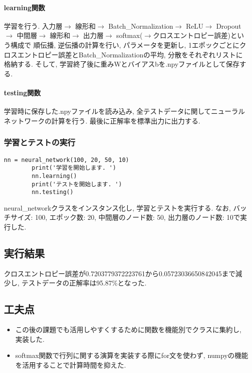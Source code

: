 \documentclass[a4j, titlepage]{jarticle}
\begin{document}
\begin{itemize}
        \paragraph*{learning関数}
            学習を行う.
            入力層$\rightarrow$
            線形和$\rightarrow$
            Batch\_Normalization$\rightarrow$
            ReLU$\rightarrow$
            Dropout$\rightarrow$
            中間層$\rightarrow$
            線形和$\rightarrow$
            出力層$\rightarrow$
            softmax($\rightarrow$クロスエントロピー誤差)という構成で
            順伝播, 逆伝播の計算を行い, パラメータを更新し,
            1エポックごとにクロスエントロピー誤差とBatch\_Normalizationの平均, 分散をそれぞれリストに格納する.
            そして, 学習終了後に重みWとバイアスbを.npyファイルとして保存する.
        \paragraph*{testing関数}
            学習時に保存した.npyファイルを読み込み, 全テストデータに関してニューラルネットワークの計算を行う. 最後に正解率を標準出力に出力する.

    \subsubsection{学習とテストの実行}
        \begin{lstlisting}[caption=学習とテストの実行,label=fuga]
        nn = neural_network(100, 20, 50, 10)
        print('学習を開始します. ')
        nn.learning()
        print('テストを開始します. ')
        nn.testing()
        \end{lstlisting}
        neural\_networkクラスをインスタンス化し, 学習とテストを実行する.
        なお, バッチサイズ: 100, エポック数: 20, 中間層のノード数: 50, 出力層のノード数: 10で実行した.

\subsection*{実行結果}
クロスエントロピー誤差が0.7203779372223761から0.05723036650842045まで減少し,
テストデータの正解率は95.87\%となった.

\subsection*{工夫点}
    \begin{itemize}
        \item この後の課題でも活用しやすくするために関数を機能別でクラスに集約し, 実装した.
        \item softmax関数で行列に関する演算を実装する際にfor文を使わず, numpyの機能を活用することで計算時間を抑えた.
    \end{itemize}

\end{itemize}
\end{document}

